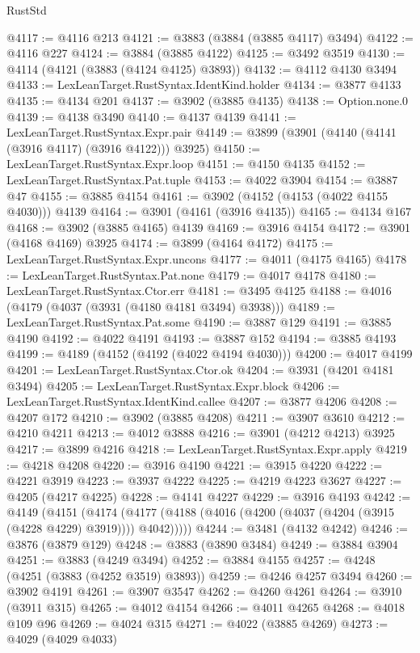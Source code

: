 \begin{lexlean}{RustStd}
\begin{coremodule}
@4117 := @4116 @213
@4121 := @3883 (@3884 (@3885 @4117) @3494)
@4122 := @4116 @227
@4124 := @3884 (@3885 @4122)
@4125 := @3492 @3519
@4130 := @4114 (@4121 (@3883 (@4124 @4125) @3893))
@4132 := @4112 @4130 @3494
@4133 := LexLeanTarget.RustSyntax.IdentKind.holder
@4134 := @3877 @4133
@4135 := @4134 @201
@4137 := @3902 (@3885 @4135)
@4138 := Option.none.{0}
@4139 := @4138 @3490
@4140 := @4137 @4139
@4141 := LexLeanTarget.RustSyntax.Expr.pair
@4149 := @3899 (@3901 (@4140 (@4141 (@3916 @4117) (@3916 @4122))) @3925)
@4150 := LexLeanTarget.RustSyntax.Expr.loop
@4151 := @4150 @4135
@4152 := LexLeanTarget.RustSyntax.Pat.tuple
@4153 := @4022 @3904
@4154 := @3887 @47
@4155 := @3885 @4154
@4161 := @3902 (@4152 (@4153 (@4022 @4155 @4030))) @4139
@4164 := @3901 (@4161 (@3916 @4135))
@4165 := @4134 @167
@4168 := @3902 (@3885 @4165) @4139
@4169 := @3916 @4154
@4172 := @3901 (@4168 @4169) @3925
@4174 := @3899 (@4164 @4172)
@4175 := LexLeanTarget.RustSyntax.Expr.uncons
@4177 := @4011 (@4175 @4165)
@4178 := LexLeanTarget.RustSyntax.Pat.none
@4179 := @4017 @4178
@4180 := LexLeanTarget.RustSyntax.Ctor.err
@4181 := @3495 @4125
@4188 := @4016 (@4179 (@4037 (@3931 (@4180 @4181 @3494) @3938)))
@4189 := LexLeanTarget.RustSyntax.Pat.some
@4190 := @3887 @129
@4191 := @3885 @4190
@4192 := @4022 @4191
@4193 := @3887 @152
@4194 := @3885 @4193
@4199 := @4189 (@4152 (@4192 (@4022 @4194 @4030)))
@4200 := @4017 @4199
@4201 := LexLeanTarget.RustSyntax.Ctor.ok
@4204 := @3931 (@4201 @4181 @3494)
@4205 := LexLeanTarget.RustSyntax.Expr.block
@4206 := LexLeanTarget.RustSyntax.IdentKind.callee
@4207 := @3877 @4206
@4208 := @4207 @172
@4210 := @3902 (@3885 @4208)
@4211 := @3907 @3610
@4212 := @4210 @4211
@4213 := @4012 @3888
@4216 := @3901 (@4212 @4213) @3925
@4217 := @3899 @4216
@4218 := LexLeanTarget.RustSyntax.Expr.apply
@4219 := @4218 @4208
@4220 := @3916 @4190
@4221 := @3915 @4220
@4222 := @4221 @3919
@4223 := @3937 @4222
@4225 := @4219 @4223 @3627
@4227 := @4205 (@4217 @4225)
@4228 := @4141 @4227
@4229 := @3916 @4193
@4242 := @4149
    (@4151
      (@4174 (@4177 (@4188 (@4016 (@4200 (@4037 (@4204 (@3915 (@4228 @4229) @3919)))) @4042)))))
@4244 := @3481 (@4132 @4242)
@4246 := @3876 (@3879 @129)
@4248 := @3883 (@3890 @3484)
@4249 := @3884 @3904
@4251 := @3883 (@4249 @3494)
@4252 := @3884 @4155
@4257 := @4248 (@4251 (@3883 (@4252 @3519) @3893))
@4259 := @4246 @4257 @3494
@4260 := @3902 @4191
@4261 := @3907 @3547
@4262 := @4260 @4261
@4264 := @3910 (@3911 @315)
@4265 := @4012 @4154
@4266 := @4011 @4265
@4268 := @4018 @109 @96
@4269 := @4024 @315
@4271 := @4022 (@3885 @4269)
@4273 := @4029 (@4029 @4033)

\end{coremodule}
\end{lexlean}
